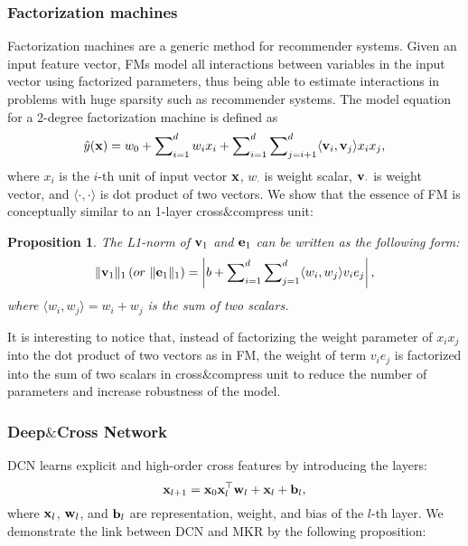\documentclass[sigconf]{acmart}
\newtheorem{proposition}{Proposition}
\begin{document}
		\subsubsection{Factorization machines}
		Factorization machines \cite{rendle2010factorization, rendle2012factorization} are a generic method for recommender systems.
		Given an input feature vector, FMs model all interactions between variables in the input vector using factorized parameters, thus being able to estimate interactions in problems with huge sparsity such as recommender systems.
		The model equation for a 2-degree factorization machine is defined as
		\begin{equation}		
			\hat y({\bf x}) = w_0 + \sum\nolimits_{i=1}^d w_i x_i + \sum\nolimits_{i=1}^d \sum\nolimits_{j=i+1}^d \langle {\bf v}_i, {\bf v}_j \rangle x_i x_j,
		\end{equation}
		where $x_i$ is the $i$-th unit of input vector $\bf x$, $w_\cdot$ is weight scalar, ${\bf v}_\cdot$ is weight vector, and $\langle \cdot, \cdot \rangle$ is dot product of two vectors.
		We show that the essence of FM is conceptually similar to an 1-layer cross$\&$compress unit:
		
		\begin{proposition}
		\label{prop:1}
			The L1-norm of ${\bf v}_1$ and ${\bf e}_1$ can be written as the following form:
			\begin{equation}
				\|{\bf v}_1\|_1 \left( or \ \|{\bf e}_1\|_1 \right) = \left| b + \sum\nolimits_{i=1}^d \sum\nolimits_{j=1}^d \langle w_i, w_j \rangle v_i e_j \right|,
			\end{equation}
			where $\langle w_i, w_j \rangle = w_i + w_j$ is the sum of two scalars.
		\end{proposition}
		
		It is interesting to notice that, instead of factorizing the weight parameter of $x_i x_j$ into the dot product of two vectors as in FM, the weight of term $v_i e_j$ is factorized into the sum of two scalars in cross$\&$compress unit to reduce the number of parameters and increase robustness of the model.
		
		
		\subsubsection{Deep$\&$Cross Network}
		DCN \cite{wang2017deep} learns explicit and high-order cross features by introducing the layers:
		\begin{equation}
			{\bf x}_{l+1} = {\bf x}_0 {\bf x}_l^\top {\bf w}_l + {\bf x}_l + {\bf b}_l,
		\end{equation}			
		where ${\bf x}_l$, ${\bf w}_l$, and ${\bf b}_l$ are representation, weight, and bias of the $l$-th layer.
		We demonstrate the link between DCN and MKR by the following proposition:
		
\end{document}
